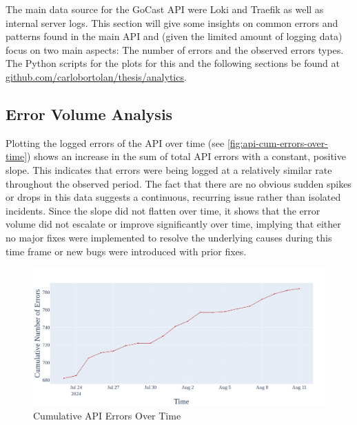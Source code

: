 The main data source for the GoCast \ac{API} were Loki and Traefik as well as internal server logs. This section will give some insights on common errors and patterns found in the main \ac{API} and (given the limited amount of logging data) focus on two main aspects: The number of errors and the observed errors types. The Python scripts for the plots for this and the following sections be found at \href{https://github.com/carlobortolan/thesis/tree/analytics}{github.com/carlobortolan/thesis/analytics}.

\subsection{Error Volume Analysis}

Plotting the logged errors of the \ac{API} over time (see \autoref{fig:api-cum-errors-over-time}) shows an increase in the sum of total \ac{API} errors with a constant, positive slope. This indicates that errors were being logged at a relatively similar rate throughout the observed period. The fact that there are no obvious sudden spikes or drops in this data suggests a continuous, recurring issue rather than isolated incidents. Since the slope did not flatten over time, it shows that the error volume did not escalate or improve significantly over time, implying that either no major fixes were implemented to resolve the underlying causes during this time frame or new bugs were introduced with prior fixes.

\begin{figure}[htpb]
    \centering
    \includegraphics[width=\linewidth]{images/plots/api/cum_errors_over_time.png}
    \caption[Cumulative \ac{API} Errors Over Time]{Cumulative \ac{API} Errors Over Time}\label{fig:api-cum-errors-over-time}
\end{figure}


